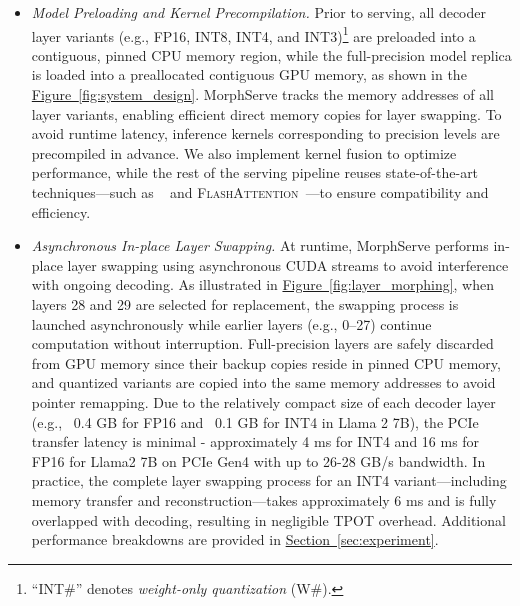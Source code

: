 \documentclass{article}
\newcommand{\system}{{MorphServe}\xspace}
\newcommand{\FlashAttention}{\textsc{FlashAttention}\xspace}
\newcommand{\PagedAttention}{\text{PagedAttention}\xspace}
\begin{document}
{\begin{itemize}[leftmargin=*]
    \item \textit{Model Preloading and Kernel Precompilation.}
    Prior to serving, all decoder layer variants (e.g., FP16, INT8, INT4, and INT3)\footnote{{``INT\#'' denotes \textit{weight-only quantization} (W\#). 
    }}
    are preloaded into a contiguous, pinned CPU memory region, while the full-precision model replica is loaded into a preallocated contiguous GPU memory, as shown in the \hyperref[fig:system_design]{Figure~\ref{fig:system_design}}.
    {\system} tracks the memory addresses of all layer variants, enabling efficient direct memory copies for layer swapping. 
    To avoid runtime latency, inference kernels corresponding to precision levels are precompiled in advance. 
    We also implement kernel fusion to optimize performance, while the rest of the serving pipeline reuses state-of-the-art techniques---such as {\PagedAttention}~\cite{kwon2023efficient_vllm} and {\FlashAttention}~\cite{dao2022flashattention, dao2023flashattention_v2}---to ensure compatibility and efficiency.

    \item \textit{Asynchronous In-place Layer Swapping.}  
    At runtime, {\system} performs in-place layer swapping using asynchronous CUDA streams to avoid interference with ongoing decoding. As illustrated in \hyperref[fig:layer_morphing]{Figure~\ref{fig:layer_morphing}}, when layers 28 and 29 are selected for replacement, the swapping process is launched asynchronously while earlier layers (e.g., 0–27) continue computation without interruption. Full-precision layers are safely discarded from GPU memory since their backup copies reside in pinned CPU memory, and quantized variants are copied into the same memory addresses to avoid pointer remapping. Due to the relatively compact size of each decoder layer (e.g., ~0.4 GB for FP16 and ~0.1 GB for INT4 in Llama 2 7B), the PCIe transfer latency is minimal - approximately 4 ms for INT4 and 16 ms for FP16 for Llama2 7B on PCIe Gen4 with up to 26-28 GB/s bandwidth. In practice, the complete layer swapping process for an INT4 variant—including memory transfer and reconstruction—takes approximately 6 ms and is fully overlapped with decoding, resulting in negligible TPOT overhead. Additional performance breakdowns are provided in \hyperref[sec:experiment]{Section~\ref{sec:experiment}}.
\end{itemize}

}
\end{document}
